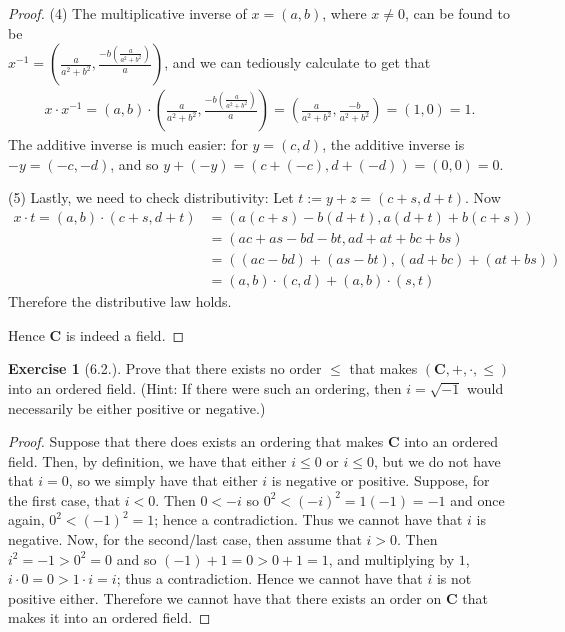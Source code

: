 \documentclass[9pt,reqno]{amsart}
\theoremstyle{definition}
\newtheorem{exercise}{Exercise}[section]
\newcommand{\cc}{\mathbf C}
\begin{document}
\begin{proof}
	(4) The multiplicative inverse of $x = (a,b)$, where $x \neq 0$, can be found to be \\ $x^{-1} = \left (\frac{a}{a^2+b^2}, \frac{-b(\frac{a}{a^2+b^2})}{a} \right)$, and we can tediously calculate to get that 
	\begin{align}
	x \cdot x^{-1} = (a,b) \cdot \left (\frac{a}{a^2+b^2}, \frac{-b(\frac{a}{a^2+b^2})}{a} \right ) = \left (\frac{a}{a^2+b^2}, \frac{-b}{a^2+b^2} \right ) =(1,0) = 1.
	\end{align} The additive inverse is much easier: for $y = (c,d)$, the additive inverse is $ -y = (-c, -d)$, and so $y+(-y) = (c+(-c), d+(-d)) = (0, 0) = 0$. 
	
	(5) Lastly, we need to check distributivity: Let $t := y+z = (c+s, d+t)$. Now 
	\begin{align*}
x \cdot t = (a,b) \cdot (c+s, d+t) &= (a(c+s)-b(d+t), a(d+t)+b(c+s)) \\ &= (ac+as-bd-bt, ad+at+bc+bs) \\
&= ((ac-bd)+(as-bt) , (ad+bc) + (at+bs)) \\
&= (a,b) \cdot (c,d) + (a,b) \cdot (s,t)
	\end{align*}
Therefore the distributive law holds.

Hence $\cc$ is indeed a field. 
\end{proof}
\begin{exercise}[6.2.] Prove that there exists no order $\leq$ that makes $(\cc, +, \cdot,  \leq)$ into an ordered field. (Hint: If there were such an ordering, then $i = \sqrt{-1}$ would necessarily be either positive or negative.)
\end{exercise}
\begin{proof}
	Suppose that there does exists an ordering that makes $\cc$ into an ordered field. Then, by definition, we have that either $i \leq 0$ or $i \leq 0$, but we do not have that $i = 0$, so we simply have that either $i$ is negative or positive. Suppose, for the first case, that $i<0$. Then $0 < -i$ so $0^2 <(-i)^2 = 1(-1) = -1$ and once again, $0^2 < (-1)^2 = 1$; hence a contradiction. Thus we cannot have that $i$ is negative. Now, for the second/last case, then assume that $i>0$. Then $i^2 = -1 >0^2 = 0$ and so $(-1)+1 =0> 0 +1 =1$, and multiplying by $1$, $i \cdot 0 = 0 > 1 \cdot i = i$; thus a contradiction. Hence we cannot have that $i$ is not positive either. Therefore we cannot have that there exists an order on $\cc$ that makes it into an ordered field. 
	\end{proof}
\end{document}
